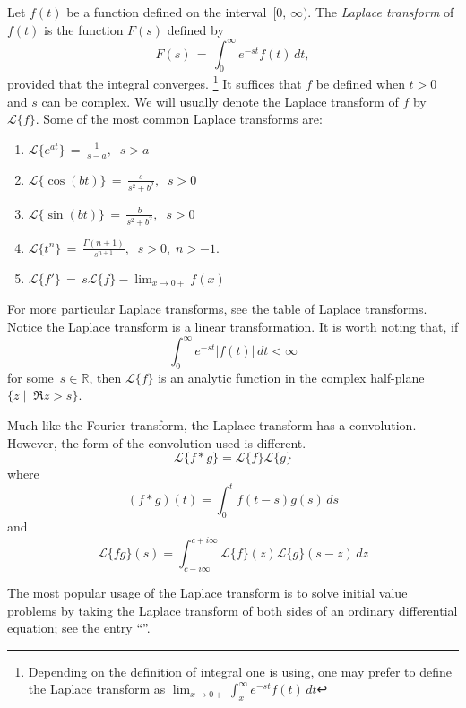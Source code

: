 \documentclass[12pt]{article}
\begin{document}
Let $f(t)$ be a function defined on the interval \,$[0,\,\infty)$.  The
\emph{Laplace transform} of $f(t)$ is the function $F(s)$ defined by
\[
F(s)\,=\,\int_{0}^{\infty}e^{-st} f(t)\,dt,
\]
provided that the integral converges. \footnote{Depending on the definition of
integral one is using, one may prefer to define the Laplace transform as
$\lim_{x \to 0+} \int_{x}^{\infty}e^{-st} f(t)\,dt$}  It suffices that $f$ be defined when $t>0$ and $s$ can be complex.  We will 
usually denote the Laplace transform of $f$ by $\mathcal{L}\{f\}$.  Some
of the most common Laplace transforms are:

\begin{enumerate}
\item $\displaystyle\mathcal{L}\{e^{at}\}\,=\,\frac{1}{s-a},\;\; s>a$

\item $\displaystyle\mathcal{L}\{\cos(bt)\}\,=\,\frac{s}{s^{2}+b^{2}},\;\; s>0$

\item $\displaystyle\mathcal{L}\{\sin(bt)\}\,=\,\frac{b}{s^{2}+b^{2}},\;\; s>0$

\item $\displaystyle\mathcal{L}\{t^{n}\}\,=\,\frac{\Gamma(n+1)}{s^{n+1}},\;\; s>0,\; n>-1.$

\item $\displaystyle\mathcal{L}\{f'\}\,=\, s\mathcal{L}\{f\}-\lim_{x \to 0+}f(x)$
\end{enumerate}

For more particular Laplace transforms, see the table of Laplace 
transforms.\\

Notice the Laplace transform is a linear transformation.  It is worth noting that, if 
 $$\int_{0}^{\infty}e^{-st}|f(t)|\,dt < \infty$$
for some\, $s \in \mathbb{R}$, then $\mathcal{L}\{f\}$ is an analytic function in the complex half-plane 
$\{z \mid\; \Re z > s\}$.

Much like the Fourier transform, the Laplace transform has a convolution.  However, the form of the convolution used is different.
$$\mathcal{L}\{f*g\} = \mathcal{L}\{f\} \mathcal{L}\{g\}$$
where
$$(f*g) (t) = \int_0^t f(t-s) g(s) \, ds$$
and
$$\mathcal{L}\{fg\}(s) = \int_{c - i \infty}^{c + i \infty} \mathcal{L}\{f\}(z) \mathcal{L}\{g\}(s-z) \, dz$$

The most popular usage of the Laplace transform is to solve 
initial value problems by taking the Laplace transform of both 
sides of an ordinary differential equation; see the entry 
``''.
\end{document}
